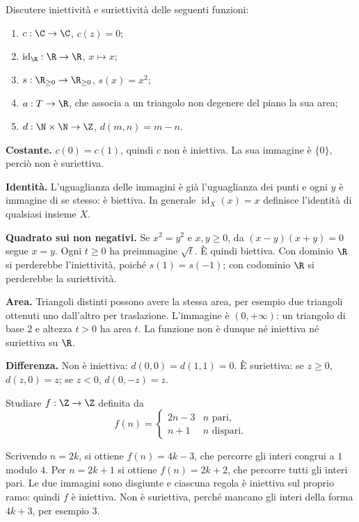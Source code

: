 \begin{esercizio}
Discutere iniettività e suriettività delle seguenti funzioni:
\begin{enumerate}[label=\alph*)]
  \item $c:\C\to\C$, $c(z)=0$;
  \item $\operatorname{id}_{\R}:\R\to\R$, $x\mapsto x$;
  \item $s:\R_{\ge0}\to\R_{\ge0}$, $s(x)=x^2$;
  \item $a:T\to\R$, che associa a un triangolo non degenere del piano la sua area;
  \item $d:\N\times\N\to\Z$, $d(m,n)=m-n$.
\end{enumerate}
\end{esercizio}
\begin{svolgimento}
\textbf{Costante.} $c(0)=c(1)$, quindi $c$ non è iniettiva. La sua immagine è $\{0\}$, perciò non è suriettiva.

\textbf{Identità.} L'uguaglianza delle immagini è già l'uguaglianza dei punti e ogni $y$ è immagine di se stesso: è biettiva. In generale $\operatorname{id}_X(x)=x$ definisce l'identità di qualsiasi insieme $X$.

\textbf{Quadrato sui non negativi.} Se $x^2=y^2$ e $x,y\ge0$, da $(x-y)(x+y)=0$ segue $x=y$. Ogni $t\ge0$ ha preimmagine $\sqrt t$. È quindi biettiva. Con dominio $\R$ si perderebbe l'iniettività, poiché $s(1)=s(-1)$; con codominio $\R$ si perderebbe la suriettività.

\textbf{Area.} Triangoli distinti possono avere la stessa area, per esempio due triangoli ottenuti uno dall'altro per traslazione. L'immagine è $(0,+\infty)$: un triangolo di base $2$ e altezza $t>0$ ha area $t$. La funzione non è dunque né iniettiva né suriettiva su $\R$.

\textbf{Differenza.} Non è iniettiva: $d(0,0)=d(1,1)=0$. È suriettiva: se $z\ge0$, $d(z,0)=z$; se $z<0$, $d(0,-z)=z$.
\end{svolgimento}

\begin{esercizio}
Studiare $f:\Z\to\Z$ definita da
\[
f(n)=\begin{cases}2n-3&n\text{ pari},\\n+1&n\text{ dispari}.\end{cases}
\]
\end{esercizio}
\begin{svolgimento}
Scrivendo $n=2k$, si ottiene $f(n)=4k-3$, che percorre gli interi congrui a $1$ modulo $4$. Per $n=2k+1$ si ottiene $f(n)=2k+2$, che percorre tutti gli interi pari. Le due immagini sono disgiunte e ciascuna regola è iniettiva sul proprio ramo: quindi $f$ è iniettiva. Non è suriettiva, perché mancano gli interi della forma $4k+3$, per esempio $3$.
\end{svolgimento}

